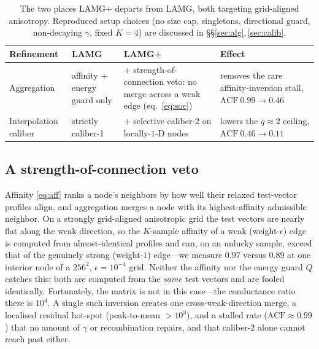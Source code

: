 \documentclass{siamart220329}
\newcommand{\acf}{\mathrm{ACF}}
\begin{document}
\begin{table}[h!]\centering
\caption{The two places LAMG+ departs from LAMG, both targeting grid-aligned anisotropy. Reproduced setup choices (no size cap, singletons, directional guard,
non-decaying $\gamma$, fixed $K{=}4$) are discussed in \S\S\ref{sec:alg},\,\ref{sec:calib}.}\label{tab:diff}
\begin{tabular}{>{\raggedright\arraybackslash}p{2.1cm}
                >{\raggedright\arraybackslash}p{2.4cm}
                >{\raggedright\arraybackslash}p{3.5cm}
                >{\raggedright\arraybackslash}p{3.1cm}}
\toprule
Refinement & LAMG & LAMG+ & Effect\\
\midrule
Aggregation & affinity $+$ energy guard only & $+$ strength-of-connection veto: no merge across
a weak edge (eq.~\eqref{eq:soc}) & removes the rare affinity-inversion stall,
$\acf\ 0.99\!\to\!0.46$\\
Interpolation caliber & strictly caliber-1 & $+$ selective caliber-2 on locally-$1$-D nodes &
lowers the $q\!\approx\!2$ ceiling, $\acf\ 0.46\!\to\!0.11$\\
\bottomrule
\end{tabular}
\end{table}

\subsection{A strength-of-connection veto}\label{sec:soc}
Affinity \eqref{eq:aff} ranks a node's neighbors by how well their relaxed test-vector
profiles align, and aggregation merges a node with its highest-affinity admissible neighbor.
On a strongly grid-aligned anisotropic grid the test vectors are nearly flat along the weak
direction, so the $K$-sample affinity of a weak (weight-$\epsilon$) edge is computed from
almost-identical profiles and can, on an unlucky sample, exceed that of the genuinely
strong (weight-$1$) edge---we measure $0.97$ versus $0.89$ at one interior node of a $256^2$,
$\epsilon=10^{-4}$ grid. Neither the affinity nor the energy guard $Q$ catches this: both are
computed from the \emph{same} test vectors and are fooled identically. Fortunately, the matrix is
not in this case---the conductance ratio there is $10^4$. A single such inversion creates one
cross-weak-direction merge, a localised residual hot-spot (peak-to-mean $>10^3$), and a stalled
rate ($\acf\approx0.99$) that no amount of $\gamma$ or recombination repairs, and that
caliber-2 alone cannot reach past either.
\end{document}
